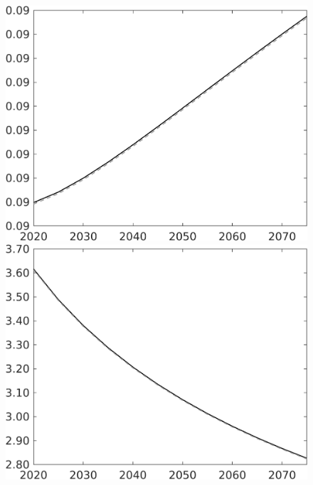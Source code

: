\documentclass[12pt]{article}
\begin{document}
\begin{figure}[h!!]
\begin{minipage}[]{0.32\textwidth}
	\end{minipage}		
	\begin{minipage}[]{0.32\textwidth}
		\includegraphics[width=1\textwidth]{../../codding_model/own_basedOnFried/optimalPol_010922_revision/figures/all_13Sept22/CompTaul_LFBAU_Reg0_pepn_spillover0_nsk0_xgr0_knspil0_sep1_countec0_GovRev0_etaa0.79_lgd0.png}
	\end{minipage}	
	\begin{minipage}[]{0.32\textwidth}
		\includegraphics[width=1\textwidth]{../../codding_model/own_basedOnFried/optimalPol_010922_revision/figures/all_13Sept22/CompTaul_LFBAU_Reg0_pgpftf_spillover0_nsk0_xgr0_knspil0_sep1_countec0_GovRev0_etaa0.79_lgd0.png}

\end{minipage}
\end{figure}
\end{document}
